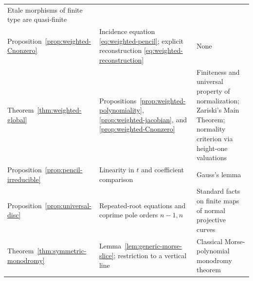 \begin{longtable}{>{\raggedright\arraybackslash}p{}
                  >{\raggedright\arraybackslash}p{}
                  >{\raggedright\arraybackslash}p{}}
Etale morphisms of finite type are quasi-finite \\
\addlinespace
Proposition~\ref{prop:weighted-Cnonzero} &
Incidence equation \eqref{eq:weighted-pencil}; explicit reconstruction
\eqref{eq:weighted-reconstruction} & None \\
\addlinespace
Theorem~\ref{thm:weighted-global} &
Propositions~\ref{prop:weighted-polynomiality},
\ref{prop:weighted-jacobian}, and \ref{prop:weighted-Cnonzero} &
Finiteness and universal property of normalization; Zariski's Main Theorem;
normality criterion via height-one valuations \\
\addlinespace
Proposition~\ref{prop:pencil-irreducible} &
Linearity in $t$ and coefficient comparison & Gauss's lemma \\
\addlinespace
Proposition~\ref{prop:universal-disc} &
Repeated-root equations and coprime pole orders $n-1,n$ &
Standard facts on finite maps of normal projective curves \\
\addlinespace
Theorem~\ref{thm:symmetric-monodromy} &
Lemma~\ref{lem:generic-morse-slice}; restriction to a vertical line &
Classical Morse-polynomial monodromy theorem \\
\bottomrule
\end{longtable}
\normalsize
